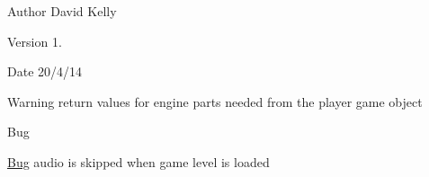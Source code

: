\begin{DoxyAuthor}{Author}
David Kelly 
\end{DoxyAuthor}
\begin{DoxyVersion}{Version}
1. 
\end{DoxyVersion}
\begin{DoxyDate}{Date}
20/4/14
\end{DoxyDate}
\begin{DoxyWarning}{Warning}
return values for engine parts needed from the player game object
\end{DoxyWarning}
\begin{DoxyRefDesc}{Bug}
\item[\hyperlink{bug__bug000003}{Bug}]audio is skipped when game level is loaded \end{DoxyRefDesc}


